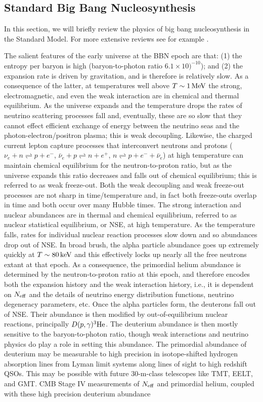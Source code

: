 \subsection{Standard Big Bang Nucleosynthesis} \label{StandardBBN}
In this section, we will briefly review the physics of big bang nucleosynthesis in the Standard Model.  For more extensive reviews see for example \cite{Weinberg:2008zzc,Agashe:2014kda,Cyburt:2015mya}.

The salient features of the early universe at the BBN epoch are that: (1) the entropy per baryon is high (baryon-to-photon ratio $6.1\times {10)}^{-10}$); and (2) the expansion rate is driven by gravitation, and is therefore is relatively slow. As a consequence of the latter, at temperatures well above $T \sim 1\,{\rm MeV}$ the strong, electromagnetic, and even the weak interaction are in chemical and thermal equilibrium. As the universe expands and the temperature drops the rates of neutrino scattering processes fall and, eventually, these are so slow that they cannot effect efficient exchange of energy between the neutrino seas and the photon-electron/positron plasma; this is weak decoupling. Likewise, the charged current lepton capture processes that interconvert neutrons and protons ($\nu_e+n\rightleftharpoons p +e^-$, $\bar\nu_e+p \rightleftharpoons n +e^+$, $n\rightleftharpoons p +e^-+\bar\nu_e$) at high temperature can maintain chemical equilibrium for the neutron-to-proton ratio, but as the universe expands this ratio decreases and falls out of chemical equilibrium; this is referred to as weak freeze-out. Both the weak decoupling and weak freeze-out processes are not sharp in time/temperature and, in fact both freeze-outs overlap in time and both occur over many Hubble times. The strong interaction and nuclear abundances are in thermal and chemical equilibrium, referred to as nuclear statistical equilibrium, or NSE,  at high temperature. As the temperature falls, rates for individual nuclear reaction processes slow down and so abundances drop out of NSE. In broad brush, the alpha particle abundance goes up extremely quickly at $T \sim 80\,{\rm keV}$ and this effectively locks up nearly all the free neutrons extant at that epoch. As a consequence, the primordial helium abundance is determined by the neutron-to-proton ratio at this epoch, and therefore encodes both the expansion history and the weak interaction history, i.e., it is dependent on $N_{\rm eff}$ and the details of neutrino energy distribution functions, neutrino degeneracy parameters, etc. Once the alpha particles form, the deuterons fall out of NSE. Their abundance is then modified by out-of-equilibrium nuclear reactions, principally $D(p, \gamma)^3{\rm He}$. The deuterium abundance is then mostly sensitive to the baryon-to-photon ratio, though weak interactions and neutrino physics do play a role in setting this abundance. The primordial abundance of deuterium may be measurable to high precision in isotope-shifted hydrogen absorption lines from Lyman limit systems along lines of sight to high redshift QSOs. This may be possible with future 30-m-class telescopes like TMT, EELT, and GMT. CMB Stage IV measurements of $N_{\rm eff}$ and primordial helium, coupled with these high precision deuterium abundance 